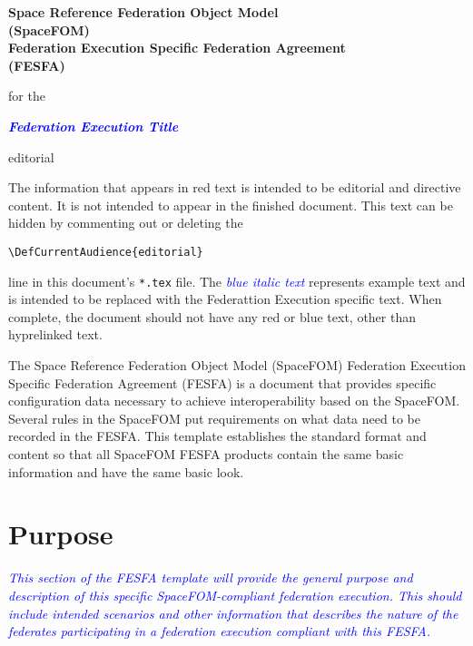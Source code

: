 \documentclass[11pt,english,letterpaper]{article}
\newcommand{\example}[1]{{\textcolor{blue}{\textit{#1}}}}
\begin{document}
\begin{center}
\begin{LARGE}
{\bfseries Space Reference Federation Object Model\\
(SpaceFOM)\\
Federation Execution Specific Federation Agreement\\
(FESFA)}\\
\vspace{10pt}
\end{LARGE}
{\normalsize for the}\\
\vspace{10pt}
\begin{LARGE}
{\bfseries \example{\textlangle{}Federation Execution Title\textrangle{}}}
\end{LARGE}
\end{center}

\begin{shownto}{editorial}
{\color{red} The information that appears in red text is intended
to be editorial and directive content.  It is not intended to appear in the
finished document.  This text can be hidden by commenting out or deleting the

\texttt{\textbackslash DefCurrentAudience\{editorial\}}

line in this document's \texttt{*.tex} file.  The \example{blue italic text}
represents example text and is intended to be replaced with the Federattion
Execution specific text.  When complete, the document should not have any red
or {\color{blue}blue} text, other than hyprelinked text.

The Space Reference Federation Object Model (SpaceFOM) Federation Execution
Specific Federation Agreement (FESFA) is a document that provides specific
configuration data necessary to achieve interoperability based on the SpaceFOM.
Several rules in the SpaceFOM put requirements on what data need to be recorded
in the FESFA. This template establishes the standard format and content so that
all SpaceFOM FESFA products contain the same basic information and have the
same basic look.}
\end{shownto}


\section*{Purpose}

\example{ This section of the FESFA template will provide the general purpose
and description of this specific SpaceFOM-compliant federation execution.
This should include intended scenarios and other information that describes
the nature of the federates participating in a federation execution compliant
with this FESFA.\cite{IEEE1516:FRAMEWORK,IEEE1516:API,IEEE1516:OMT}}
\end{document}

